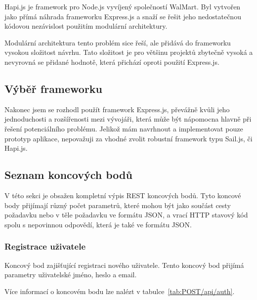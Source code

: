 Hapi.js je framework pro Node.js vyvíjený společností WalMart.
Byl vytvořen jako přímá náhrada frameworku Express.js a snaží se řešit jeho nedostatečnou kódovou nezávislost použitím modulární architektury.

Modulární architektura tento problém sice řeší, ale přidává do frameworku vysokou složitost návrhu.
Tato složitost je pro většinu projektů zbytečně vysoká a nevyrovná se přidané hodnotě, která přichází oproti použití Express.js.

\subsection{Výběř frameworku}\label{subsec:výběřFrameworku}

Nakonec jsem se rozhodl použít framework Express.js, převážně kvůli jeho jednoduchosti a rozšířenosti mezi vývojáři, která může být nápomocna hlavně při řešení potenciálního problému.
Jelikož mám navrhnout a implementovat pouze prototyp aplikace, nepovažuji za vhodné zvolit robustní framework typu Sail.js, či Hapi.js.

\subsection{Seznam koncových bodů}\label{subsec:seznamKoncovýchBodů}

V této sekci je obsažen kompletní výpis \gls{REST} koncových bodů.
Tyto koncové body přijímají různý počet parametrů, které mohou být jako součást cesty požadavku nebo v těle požadavku ve formátu \gls{JSON}, a vrací \gls{HTTP} stavový kód spolu s nepovinnou odpovědí, která je také ve formátu \gls{JSON}.

\subsubsection{Registrace uživatele}

Koncový bod zajišťující registraci nového uživatele.
Tento koncový bod přijímá parametry uživatelské jméno, heslo a email.

Více informací o koncovém bodu lze nalézt v tabulce~\ref{tab:POST/api/auth}.


